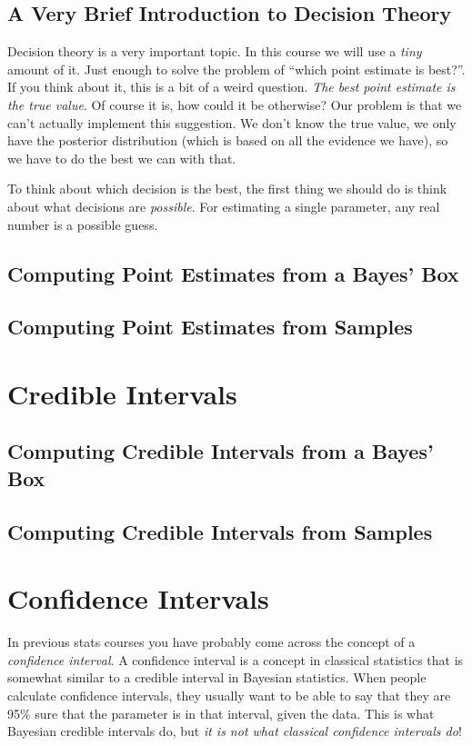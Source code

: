 \subsection{A Very Brief Introduction to Decision Theory}
Decision theory is a very important topic. In this course we will use a
{\it tiny} amount of it. Just enough to solve the problem of ``which point
estimate is best?''. If you think about it, this is a bit of a weird question.
{\it The best point estimate is the true value}. Of course it is, how could it
be otherwise? Our problem is that we can't actually implement this suggestion.
We don't know the true value, we only have the posterior distribution
(which is based on all the evidence we have), so we have to do 
the best we can with that.

To think about which decision is the best, the first thing we should do is think
about what decisions are {\it possible}. For estimating a single parameter, any
real number is a possible guess.






\subsection{Computing Point Estimates from a Bayes' Box}


\subsection{Computing Point Estimates from Samples}





\section{Credible Intervals}

\subsection{Computing Credible Intervals from a Bayes' Box}


\subsection{Computing Credible Intervals from Samples}


\section{Confidence Intervals}
In previous stats courses you have probably come across the concept of a
{\it confidence interval}. A confidence interval is a concept in classical
statistics that is somewhat similar to a credible interval in Bayesian statistics.
When people calculate confidence intervals, they usually want to be
able to say that they are 95\% sure that the parameter is in that interval,
given the data. This is what Bayesian credible intervals do, but {\it it is not
what classical confidence intervals do}!

